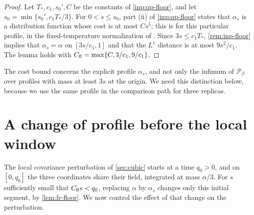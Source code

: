 \begin{proof}
Let $T_*,c_1,s_0',C$ be the constants of \cref{inp:qp-floor}, and let $s_0=\min\{s_0',c_1T_*/3\}$. For $0<s\le s_0$, part (ii) of \cref{inp:qp-floor} states that $\alpha_s$ is a distribution function whose cost is at most $Cs^5$; this is \cite[Lemma~7.2, (7.3)]{quantitative-parisi} for this particular profile, in the fixed-temperature normalization of \cite[Proposition~7.12]{quantitative-parisi}. Since $3s\le c_1T_*$, \cref{rem:inp-floor} implies that $\alpha_s=\alpha$ on $[3s/c_1,1]$ and that the $L^1$ distance is at most $9s^2/c_1$. The lemma holds with $C_{\rm fl}=\max\{C,3/c_1,9/c_1\}$.
\end{proof}

The cost bound concerns the explicit profile $\alpha_s$, and not only the infimum of $\mathcal P_\beta$ over profiles with mass at least $3s$ at the origin. We need this distinction below, because we use the same profile in the comparison path for three replicas.

\section{A change of profile before the local window}\label{sec:fr-prefix}

The local covariance perturbation of \cref{sec:cubic} starts at a time $q_0>0$, and on $[0,q_0]$ the three coordinates share their field, integrated at mass $\alpha/3$. For $s$ sufficiently small that $C_{\rm fl}s<q_0$, replacing $\alpha$ by $\alpha_s$ changes only this initial segment, by \cref{lem:fr-floor}. We now control the effect of that change on the perturbation.

